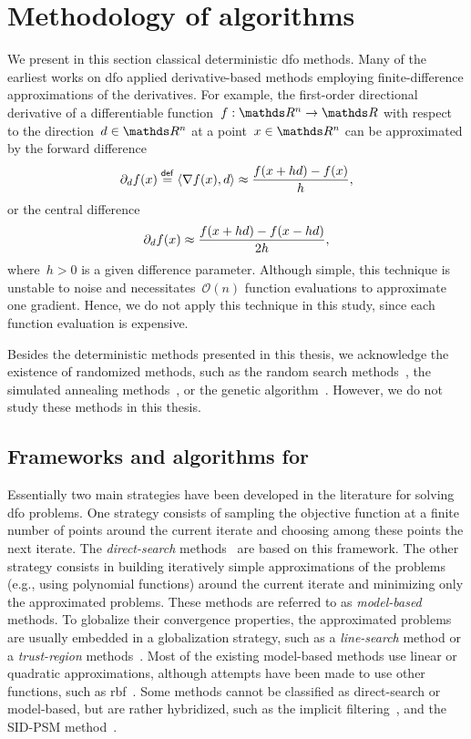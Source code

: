 \section{Methodology of  algorithms}

We present in this section classical deterministic \gls{dfo} methods.
Many of the earliest works on \gls{dfo} applied derivative-based methods employing finite-difference approximations of the derivatives.
For example, the first-order directional derivative of a differentiable function~$\obj : \R^n \to \R$ with respect to the direction~$d \in \R^n$ at a point~$x \in \R^n$ can be approximated by the forward difference
\begin{equation*}
    \partial_d f(x) \mathrel{\stackrel{\mathsf{def}}{=}} \langle\nabla f(x), d\rangle \approx \frac{f(x + hd) - f(x)}{h},
\end{equation*}
or the central difference
\begin{equation*}
    \partial_d f(x) \approx \frac{f(x + hd) - f(x - hd)}{2h},
\end{equation*}
where~$h > 0$ is a given difference parameter.
Although simple, this technique is unstable to noise and necessitates~$\mathcal{O}(n)$ function evaluations to approximate one gradient.
Hence, we do not apply this technique in this study, since each function evaluation is expensive.

Besides the deterministic methods presented in this thesis, we acknowledge the existence of randomized methods, such as the random search methods~\cite{Zhigljavsky_1991}, the simulated annealing methods~\cite{Kirkpatrick_Gelatt_Vecchi_1983}, or the genetic algorithm~\cite{Jong_1975,Holland_1975}.
However, we do not study these methods in this thesis.

\subsection{Frameworks and algorithms for }

Essentially two main strategies have been developed in the literature for solving \gls{dfo} problems.
One strategy consists of sampling the objective function at a finite number of points around the current iterate and choosing among these points the next iterate.
The \emph{direct-search} methods~\cite{Kolda_Lewis_Torczon_2003} are based on this framework.
The other strategy consists in building iteratively simple approximations of the problems (e.g., using polynomial functions) around the current iterate and minimizing only the approximated problems.
These methods are referred to as \emph{model-based} methods.
To globalize their convergence properties, the approximated problems are usually embedded in a globalization strategy, such as a \emph{line-search} method or a \emph{trust-region} methods~\cite{Conn_Gould_Toint_2000,Yuan_2015}.
Most of the existing model-based methods use linear or quadratic approximations, although attempts have been made to use other functions, such as \gls{rbf}~\cite{Oeuvray_2005}.
Some methods cannot be classified as direct-search or model-based, but are rather hybridized, such as the implicit filtering~\cite{Kelley_2011}, and the SID-PSM method~\cite{Custodio_Rocha_Vicente_2009}.


